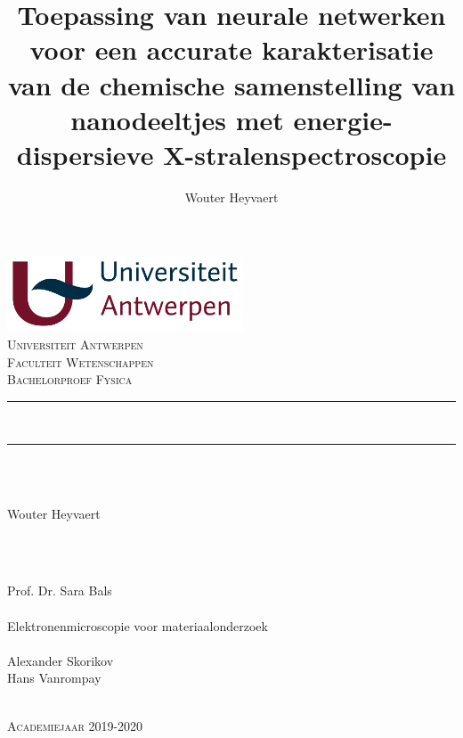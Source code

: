 \documentclass{report}
\title{Toepassing van neurale netwerken voor een accurate karakterisatie van de chemische samenstelling van nanodeeltjes met energie-dispersieve X-stralenspectroscopie}
\author{Wouter Heyvaert}
\makeatletter
\let\Title\@title
\makeatother
\begin{document}
\begin{titlepage}

	\centering
	\includegraphics[width=7cm,keepaspectratio]{ua_logo.png}\\[1.5cm]
	\LARGE\textsc{Universiteit Antwerpen}\\[0.2cm]
	\LARGE\textsc{Faculteit Wetenschappen}\\[1cm]
	\LARGE\textsc{\color{accent}Bachelorproef Fysica}\\[0.2cm]
	
	\rule{\linewidth}{0.5mm}\\
	\huge\textbf{\Title}
	\rule{\linewidth}{0.5mm}\\[0.5cm]
	
	\begin{minipage}[t]{0.4\textwidth}
	\begin{flushleft}\large
	\\
	{\color{accent}Wouter Heyvaert}
	\end{flushleft}
	\end{minipage}
	~
	\begin{minipage}[t]{0.4\textwidth}
	\begin{flushright}\large
	 \\
	{\color{accent}Prof. Dr. Sara Bals}\\[0.2cm]
	\\
	{\color{accent}Elektronenmicroscopie voor materiaalonderzoek}\\[0.2cm]
	 \\
	{\color{accent}Alexander Skorikov\\Hans Vanrompay}
	\end{flushright}
	\end{minipage}\\[2cm]
	
	\Large\textsc{Academiejaar 2019-2020}

\end{titlepage}
\end{document}
